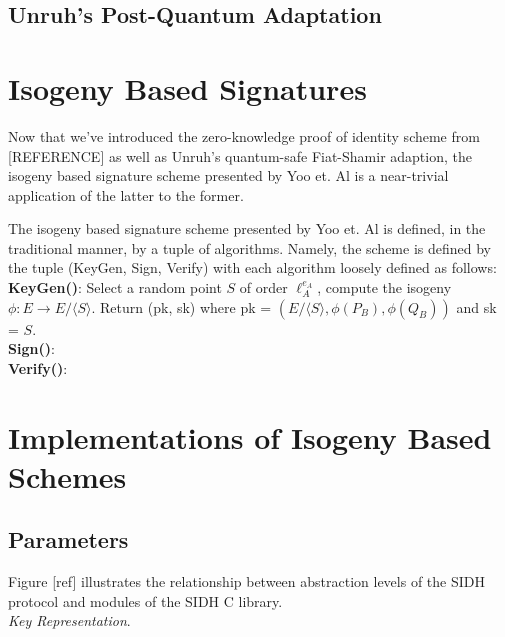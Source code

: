 \subsection{Unruh's Post-Quantum Adaptation}


\section{Isogeny Based Signatures}

Now that we've introduced the zero-knowledge proof of identity scheme from [REFERENCE] as well as Unruh's quantum-safe Fiat-Shamir adaption, the isogeny based signature scheme presented by Yoo et. Al is a near-trivial application of the latter to the former. 

The isogeny based signature scheme presented by Yoo et. Al is defined, in the traditional manner, by a tuple of algorithms. Namely, the scheme is defined by the tuple (KeyGen, Sign, Verify) with each algorithm loosely defined as follows:\\
\textbf{KeyGen(}\textbf{)}: Select a random point $S$ of order $\ell_{A}^{e_A}$, compute the isogeny $\phi: E \rightarrow E/ \langle S \rangle$. Return (pk, sk) where pk = $(E/ \langle S \rangle, \phi(P_B), \phi(Q_B))$ and sk = $S$.\\
\textbf{Sign()}:\\
\textbf{Verify()}:\\


\section{Implementations of Isogeny Based Schemes}

\subsection{Parameters}

Figure [ref] illustrates the relationship between abstraction levels of the SIDH protocol and modules of the SIDH C library.\\

\noindent
\emph{Key Representation}.


